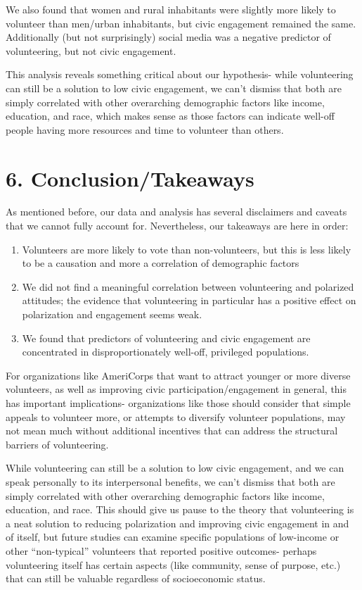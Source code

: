 \documentclass[
  letterpaper,
  DIV=11,
  numbers=noendperiod]{scrartcl}
\providecommand{\tightlist}{%
  \setlength{\itemsep}{0pt}\setlength{\parskip}{0pt}}\usepackage{longtable,booktabs,array}
\begin{document}
We also found that women and rural inhabitants were slightly more likely
to volunteer than men/urban inhabitants, but civic engagement remained
the same. Additionally (but not surprisingly) social media was a
negative predictor of volunteering, but not civic engagement.

This analysis reveals something critical about our hypothesis- while
volunteering can still be a solution to low civic engagement, we can't
dismiss that both are simply correlated with other overarching
demographic factors like income, education, and race, which makes sense
as those factors can indicate well-off people having more resources and
time to volunteer than others.

\section{6. Conclusion/Takeaways}\label{conclusiontakeaways}

As mentioned before, our data and analysis has several disclaimers and
caveats that we cannot fully account for. Nevertheless, our takeaways
are here in order:

\begin{enumerate}
\def\labelenumi{\arabic{enumi}.}
\tightlist
\item
  Volunteers are more likely to vote than non-volunteers, but this is
  less likely to be a causation and more a correlation of demographic
  factors
\item
  We did not find a meaningful correlation between volunteering and
  polarized attitudes; the evidence that volunteering in particular has
  a positive effect on polarization and engagement seems weak.
\item
  We found that predictors of volunteering and civic engagement are
  concentrated in disproportionately well-off, privileged populations.
\end{enumerate}

For organizations like AmeriCorps that want to attract younger or more
diverse volunteers, as well as improving civic participation/engagement
in general, this has important implications- organizations like those
should consider that simple appeals to volunteer more, or attempts to
diversify volunteer populations, may not mean much without additional
incentives that can address the structural barriers of volunteering.

While volunteering can still be a solution to low civic engagement, and
we can speak personally to its interpersonal benefits, we can't dismiss
that both are simply correlated with other overarching demographic
factors like income, education, and race. This should give us pause to
the theory that volunteering is a neat solution to reducing polarization
and improving civic engagement in and of itself, but future studies can
examine specific populations of low-income or other ``non-typical''
volunteers that reported positive outcomes- perhaps volunteering itself
has certain aspects (like community, sense of purpose, etc.) that can
still be valuable regardless of socioeconomic status.
\end{document}
